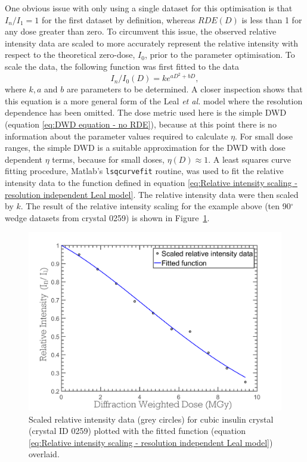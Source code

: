 One obvious issue with only using a single dataset for this optimisation is that $I_n/I_1 = 1$ for the first dataset by definition, whereas $RDE(D)$ is less than 1 for any dose greater than zero.
To circumvent this issue, the observed relative intensity data are scaled to more accurately represent the relative intensity with respect to the theoretical zero-dose, $I_0$, prior to the parameter optimisation.
To scale the data, the following function was first fitted to the data
\begin{equation}
    I_n/I_0(D) = k e^{aD^2 + bD},
    \label{eq:Relative intensity scaling - resolution independent Leal model}
\end{equation}
where $k, a$ and $b$ are parameters to be determined.
A closer inspection shows that this equation is a more general form of the Leal \textit{et al.} model where the resolution dependence has been omitted.
The dose metric used here is the simple DWD (equation \ref{eq:DWD equation - no RDE}), because at this point there is no information about the parameter values required to calculate $\eta$.
For small dose ranges, the simple DWD is a suitable approximation for the DWD with dose dependent $\eta$ terms, because for small doses, $\eta(D) \approx 1$.
A least squares curve fitting procedure, Matlab's \verb+lsqcurvefit+ routine, was used to fit the relative intensity data to the function defined in equation \ref{eq:Relative intensity scaling - resolution independent Leal model}.
The relative intensity data were then scaled by $k$.
The result of the relative intensity scaling for the example above (ten 90$^{\circ}$ wedge datasets from crystal 0259) is shown in Figure~\ref{fig:Scaled relative intensity data - ZDE}.
\begin{figure}
  \centering
    \includegraphics[width=1\textwidth]{figures/zde/ScaledFunctionFitPlot.pdf}
    \caption{Scaled relative intensity data (grey circles) for cubic insulin crystal (crystal ID 0259) plotted with the fitted function (equation \ref{eq:Relative intensity scaling - resolution independent Leal model}) overlaid.}
    \label{fig:Scaled relative intensity data - ZDE}
\end{figure}
